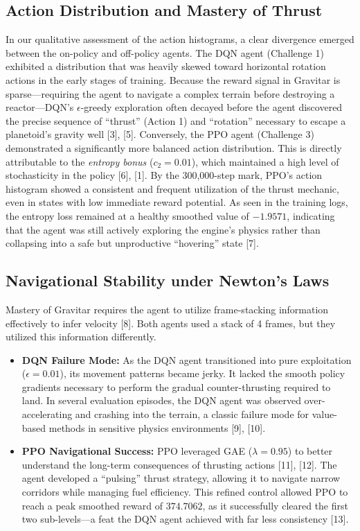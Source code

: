 \documentclass[conference]{IEEEtran}
\begin{document}
\subsection{Action Distribution and Mastery of Thrust}
In our qualitative assessment of the action histograms, a clear divergence emerged between the on-policy and off-policy agents.
The DQN agent (Challenge 1) exhibited a distribution that was heavily skewed toward horizontal rotation actions in the early stages of training.
Because the reward signal in Gravitar is sparse—requiring the agent to navigate a complex terrain before destroying a reactor—DQN's $\epsilon$-greedy exploration often decayed before the agent discovered the precise sequence of ``thrust'' (Action 1) and ``rotation'' necessary to escape a planetoid's gravity well [3], [5].
Conversely, the PPO agent (Challenge 3) demonstrated a significantly more balanced action distribution.
This is directly attributable to the \textit{entropy bonus} ($c_2 = 0.01$), which maintained a high level of stochasticity in the policy [6], [1].
By the 300,000-step mark, PPO's action histogram showed a consistent and frequent utilization of the thrust mechanic, even in states with low immediate reward potential.
As seen in the training logs, the entropy loss remained at a healthy smoothed value of \textbf{$-1.9571$}, indicating that the agent was still actively exploring the engine's physics rather than collapsing into a safe but unproductive ``hovering'' state [7].

\subsection{Navigational Stability under Newton’s Laws}
Mastery of Gravitar requires the agent to utilize frame-stacking information effectively to infer velocity [8].
Both agents used a stack of 4 frames, but they utilized this information differently.

\begin{itemize}
    \item \textbf{DQN Failure Mode:} As the DQN agent transitioned into pure exploitation ($\epsilon=0.01$), its movement patterns became jerky.
It lacked the smooth policy gradients necessary to perform the gradual counter-thrusting required to land.
In several evaluation episodes, the DQN agent was observed over-accelerating and crashing into the terrain, a classic failure mode for value-based methods in sensitive physics environments [9], [10].
    \item \textbf{PPO Navigational Success:} PPO leveraged GAE ($\lambda=0.95$) to better understand the long-term consequences of thrusting actions [11], [12].
The agent developed a ``pulsing'' thrust strategy, allowing it to navigate narrow corridors while managing fuel efficiency.
This refined control allowed PPO to reach a peak smoothed reward of \textbf{$374.7062$}, as it successfully cleared the first two sub-levels—a feat the DQN agent achieved with far less consistency [13].
\end{itemize}
\end{document}
